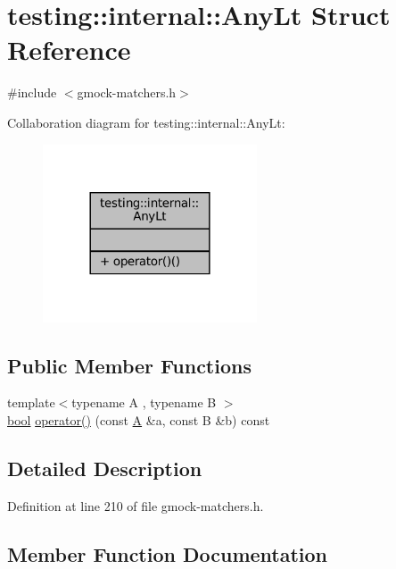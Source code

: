 \hypertarget{structtesting_1_1internal_1_1AnyLt}{}\section{testing\+:\+:internal\+:\+:Any\+Lt Struct Reference}
\label{structtesting_1_1internal_1_1AnyLt}


{\ttfamily \#include $<$gmock-\/matchers.\+h$>$}



Collaboration diagram for testing\+:\+:internal\+:\+:Any\+Lt\+:
\nopagebreak
\begin{figure}[H]
\begin{center}
\leavevmode
\includegraphics[width=180pt]{structtesting_1_1internal_1_1AnyLt__coll__graph}
\end{center}
\end{figure}
\subsection*{Public Member Functions}
\begin{DoxyCompactItemize}
\item 
{\footnotesize template$<$typename A , typename B $>$ }\\\hyperlink{classbool}{bool} \hyperlink{structtesting_1_1internal_1_1AnyLt_ac7be54cdf8fd18e12fda49d886eefb56}{operator()} (const \hyperlink{namespacetesting_a5e9134d655d2fc9323902348083282e7}{A} \&a, const B \&b) const
\end{DoxyCompactItemize}


\subsection{Detailed Description}


Definition at line 210 of file gmock-\/matchers.\+h.



\subsection{Member Function Documentation}
\mbox{\label{structtesting_1_1internal_1_1AnyLt_ac7be54cdf8fd18e12fda49d886eefb56}} 

